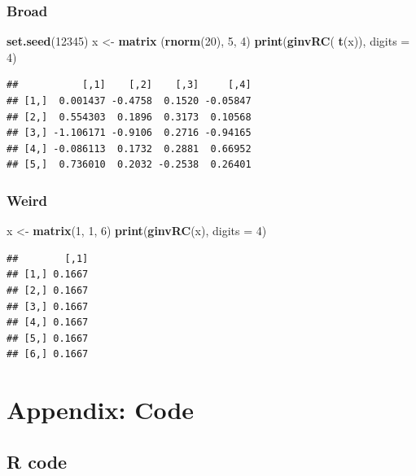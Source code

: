 \documentclass[12pt,]{article}
\newenvironment{Shaded}{\begin{snugshade}}{\end{snugshade}}
\newcommand{\KeywordTok}[1]{\textcolor[rgb]{0.13,0.29,0.53}{\textbf{#1}}}
\newcommand{\DataTypeTok}[1]{\textcolor[rgb]{0.13,0.29,0.53}{#1}}
\newcommand{\DecValTok}[1]{\textcolor[rgb]{0.00,0.00,0.81}{#1}}
\newcommand{\StringTok}[1]{\textcolor[rgb]{0.31,0.60,0.02}{#1}}
\newcommand{\NormalTok}[1]{#1}
\begin{document}
\subsubsection{Broad}\label{broad-3}

\begin{Shaded}
\begin{Highlighting}[]
\KeywordTok{set.seed}\NormalTok{(}\DecValTok{12345}\NormalTok{)}
\NormalTok{x <-}\StringTok{ }\KeywordTok{matrix}\NormalTok{ (}\KeywordTok{rnorm}\NormalTok{(}\DecValTok{20}\NormalTok{), }\DecValTok{5}\NormalTok{, }\DecValTok{4}\NormalTok{)}
\KeywordTok{print}\NormalTok{(}\KeywordTok{ginvRC}\NormalTok{( }\KeywordTok{t}\NormalTok{(x)), }\DataTypeTok{digits =} \DecValTok{4}\NormalTok{)}
\end{Highlighting}
\end{Shaded}

\begin{verbatim}
##           [,1]    [,2]    [,3]     [,4]
## [1,]  0.001437 -0.4758  0.1520 -0.05847
## [2,]  0.554303  0.1896  0.3173  0.10568
## [3,] -1.106171 -0.9106  0.2716 -0.94165
## [4,] -0.086113  0.1732  0.2881  0.66952
## [5,]  0.736010  0.2032 -0.2538  0.26401
\end{verbatim}

\subsubsection{Weird}\label{weird-3}

\begin{Shaded}
\begin{Highlighting}[]
\NormalTok{x <-}\StringTok{ }\KeywordTok{matrix}\NormalTok{(}\DecValTok{1}\NormalTok{, }\DecValTok{1}\NormalTok{, }\DecValTok{6}\NormalTok{)}
\KeywordTok{print}\NormalTok{(}\KeywordTok{ginvRC}\NormalTok{(x), }\DataTypeTok{digits =} \DecValTok{4}\NormalTok{)}
\end{Highlighting}
\end{Shaded}

\begin{verbatim}
##        [,1]
## [1,] 0.1667
## [2,] 0.1667
## [3,] 0.1667
## [4,] 0.1667
## [5,] 0.1667
## [6,] 0.1667
\end{verbatim}

\section{Appendix: Code}\label{appendix-code}

\subsection{R code}\label{r-code}
\end{document}
